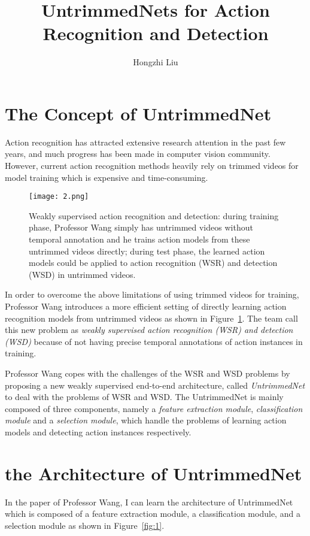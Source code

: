 \documentclass[twocolumn]{article}
\author{Hongzhi Liu}
\title{UntrimmedNets for Action Recognition and Detection}
\begin{document}
	\maketitle
	\par
	\section{The Concept of UntrimmedNet}
	Action recognition has attracted extensive research attention in the past few years, and much progress has been made in computer vision community. However, current action recognition methods heavily rely on trimmed videos for model training which is expensive and time-consuming. 
	
	\begin{figure}[htbp]
		\centering
		\texttt{[image: 2.png]}
		\caption{Weakly supervised action recognition and detection: during training phase, Professor Wang simply has untrimmed videos without temporal annotation and he trains action models from these untrimmed videos directly; during test phase, the learned action models could be applied to action recognition (WSR) and detection (WSD) in untrimmed videos.}\label{supervised}
	\end{figure}

    In order to overcome the above limitations of using trimmed videos for training, Professor Wang introduces a more efficient setting of directly learning action recognition models from untrimmed videos as shown in Figure~\ref{supervised}. The team call this new problem as \emph{weakly supervised action recognition (WSR) and detection (WSD)} because of not having precise temporal annotations of action instances in training.
    	
	Professor Wang copes with the challenges of the WSR and WSD problems by proposing a new weakly supervised end-to-end architecture, called \emph{UntrimmedNet} \cite{Wang2017UntrimmedNets} to deal with the problems of WSR and WSD. The UntrimmedNet is mainly composed of three components, namely a \emph{feature extraction module}, \emph{classification module} and a \emph{selection module}, which handle the problems of learning action models and detecting action instances respectively.

	\section{the Architecture of UntrimmedNet}
	In the paper of Professor Wang, I can learn the architecture of UntrimmedNet
	which is composed of a feature extraction module, a classification module, and a selection module as shown in Figure~\ref{fig:1}.
	
\end{document}
